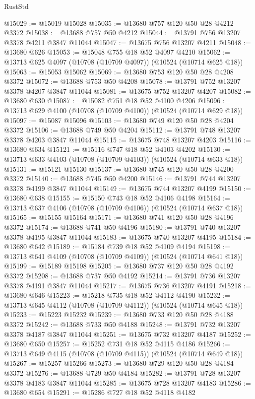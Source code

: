 \begin{lexlean}{RustStd}
\begin{coremodule}
@15029 := @15019 @15028
@15035 := @13680 @757 @120 @50 @28 @4212 @3372
@15038 := @13688 @757 @50 @4212
@15044 := @13791 @756 @13207 @3378 @4211 @3847 @11044
@15047 := @13675 @756 @13207 @4211
@15048 := @13680 @626
@15053 := @15048 @755 @18 @52 @4097 @4210
@15062 := @13713 @625 @4097 (@10708 (@10709 @4097)) (@10524 (@10714 @625 @18))
@15063 := @15053 @15062
@15069 := @13680 @753 @120 @50 @28 @4208 @3372
@15072 := @13688 @753 @50 @4208
@15078 := @13791 @752 @13207 @3378 @4207 @3847 @11044
@15081 := @13675 @752 @13207 @4207
@15082 := @13680 @630
@15087 := @15082 @751 @18 @52 @4100 @4206
@15096 := @13713 @629 @4100 (@10708 (@10709 @4100)) (@10524 (@10714 @629 @18))
@15097 := @15087 @15096
@15103 := @13680 @749 @120 @50 @28 @4204 @3372
@15106 := @13688 @749 @50 @4204
@15112 := @13791 @748 @13207 @3378 @4203 @3847 @11044
@15115 := @13675 @748 @13207 @4203
@15116 := @13680 @634
@15121 := @15116 @747 @18 @52 @4103 @4202
@15130 := @13713 @633 @4103 (@10708 (@10709 @4103)) (@10524 (@10714 @633 @18))
@15131 := @15121 @15130
@15137 := @13680 @745 @120 @50 @28 @4200 @3372
@15140 := @13688 @745 @50 @4200
@15146 := @13791 @744 @13207 @3378 @4199 @3847 @11044
@15149 := @13675 @744 @13207 @4199
@15150 := @13680 @638
@15155 := @15150 @743 @18 @52 @4106 @4198
@15164 := @13713 @637 @4106 (@10708 (@10709 @4106)) (@10524 (@10714 @637 @18))
@15165 := @15155 @15164
@15171 := @13680 @741 @120 @50 @28 @4196 @3372
@15174 := @13688 @741 @50 @4196
@15180 := @13791 @740 @13207 @3378 @4195 @3847 @11044
@15183 := @13675 @740 @13207 @4195
@15184 := @13680 @642
@15189 := @15184 @739 @18 @52 @4109 @4194
@15198 := @13713 @641 @4109 (@10708 (@10709 @4109)) (@10524 (@10714 @641 @18))
@15199 := @15189 @15198
@15205 := @13680 @737 @120 @50 @28 @4192 @3372
@15208 := @13688 @737 @50 @4192
@15214 := @13791 @736 @13207 @3378 @4191 @3847 @11044
@15217 := @13675 @736 @13207 @4191
@15218 := @13680 @646
@15223 := @15218 @735 @18 @52 @4112 @4190
@15232 := @13713 @645 @4112 (@10708 (@10709 @4112)) (@10524 (@10714 @645 @18))
@15233 := @15223 @15232
@15239 := @13680 @733 @120 @50 @28 @4188 @3372
@15242 := @13688 @733 @50 @4188
@15248 := @13791 @732 @13207 @3378 @4187 @3847 @11044
@15251 := @13675 @732 @13207 @4187
@15252 := @13680 @650
@15257 := @15252 @731 @18 @52 @4115 @4186
@15266 := @13713 @649 @4115 (@10708 (@10709 @4115)) (@10524 (@10714 @649 @18))
@15267 := @15257 @15266
@15273 := @13680 @729 @120 @50 @28 @4184 @3372
@15276 := @13688 @729 @50 @4184
@15282 := @13791 @728 @13207 @3378 @4183 @3847 @11044
@15285 := @13675 @728 @13207 @4183
@15286 := @13680 @654
@15291 := @15286 @727 @18 @52 @4118 @4182

\end{coremodule}
\end{lexlean}
